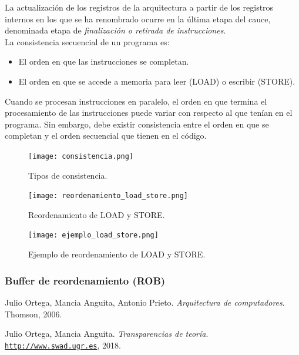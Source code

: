 \documentclass[12pt,spanish]{article}
\begin{document}
La actualización de los registros de la arquitectura a partir de los registros internos en los que se ha renombrado ocurre en la última etapa del cauce, denominada etapa de \emph{finalización o retirada de instrucciones}.\\

La consistencia secuencial de un programa es:
\begin{itemize}
	\item El orden en que las instrucciones se completan.
	\item El orden en que se accede a memoria para leer (LOAD) o escribir (STORE).
\end{itemize}

Cuando se procesan instrucciones en paralelo, el orden en que termina el procesamiento de las instrucciones puede variar con respecto al que tenían en el programa. Sin embargo, debe existir consistencia entre el orden en que se completan y el orden secuencial que tienen en el código.

\begin{figure}[H]
\centering
\texttt{[image: consistencia.png]}
\caption{Tipos de consistencia.}
\end{figure}

\begin{figure}[H]
\centering
\texttt{[image: reordenamiento\_load\_store.png]}
\caption{Reordenamiento de LOAD y STORE.}
\end{figure}

\begin{figure}[H]
\centering
\texttt{[image: ejemplo\_load\_store.png]}
\caption{Ejemplo de reordenamiento de LOAD y STORE.}
\end{figure}
	
	
	
	
\subsubsection{Buffer de reordenamiento (ROB)}



\begin{thebibliography}{9}

Julio Ortega, Mancia Anguita, Antonio Prieto. 
\textit{Arquitectura de computadores}. 
Thomson, 2006.
 
Julio Ortega, Mancia Anguita. 
\textit{Transparencias de teoría}. \\
\texttt{\url{http://www.swad.ugr.es}}, 2018.

\end{thebibliography}
\end{document}
